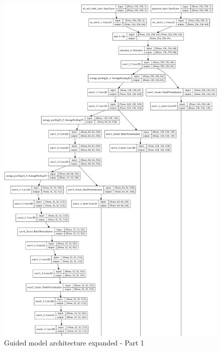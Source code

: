 \documentclass[12pt,openright,oneside,a4paper,english]{abntex2}
\begin{document}
\begin{otherlanguage}{english}
\begin{figure}[!htb]
\centering
\includegraphics[height=\textheight]{model_plot/Guided1}
\caption{Guided model architecture expanded - Part 1}
\label{guided_plot_1}
\end{figure}


\end{otherlanguage}
\end{document}

